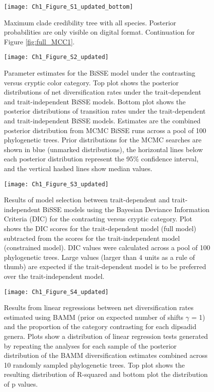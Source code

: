 \begin{figure}[h]
	\centering
	\texttt{[image: Ch1\_Figure\_S1\_updated\_bottom]}
	\caption[Maximum clade credibility tree with all species (Part 2).]{Maximum clade credibility tree with all species. Posterior probabilities are only visible on digital format. Continuation for Figure \ref{fig:full_MCC1}.}
	\label{fig:full_MCC2} %
\end{figure}

\begin{figure}[h]
	\centering
	\texttt{[image: Ch1\_Figure\_S2\_updated]}
	\caption[Parameter estimates for the BiSSE model under the contrasting versus cryptic color category.]{Parameter estimates for the BiSSE model under the contrasting versus cryptic color category. Top plot shows the posterior distributions of net diversification rates under the trait-dependent and trait-independent BiSSE models. Bottom plot shows the posterior distributions of transition rates under the trait-dependent and trait-independent BiSSE models. Estimates are the combined posterior distribution from MCMC BiSSE runs across a pool of 100 phylogenetic trees. Prior distributions for the MCMC searches are shown in blue (unmarked distributions), the horizontal lines below each posterior distribution represent the 95\% confidence interval, and the vertical hashed lines show median values.}
	\label{fig:par_BiSSE} %
\end{figure}

\begin{figure}[h]
	\centering
	\texttt{[image: Ch1\_Figure\_S3\_updated]}
	\caption[Results of model selection between trait-dependent and trait-independent BiSSE models.]{Results of model selection between trait-dependent and trait-independent BiSSE models using the Bayesian Deviance Information Criteria (DIC) for the contrasting versus cryptic category. Plot shows the DIC scores for the trait-dependent model (full model) subtracted from the scores for the trait-independent model (constrained model). DIC values were calculated across a pool of 100 phylogenetic trees. Large values (larger than 4 units as a rule of thumb) are expected if the trait-dependent model is to be preferred over the trait-independent model.}
	\label{fig:model_select} %
\end{figure}

\begin{figure}[h]
	\centering
	\texttt{[image: Ch1\_Figure\_S4\_updated]}
	\caption[Results from linear regressions between net diversification rates estimated using BAMM.]{Results from linear regressions between net diversification rates estimated using BAMM (prior on expected number of shifts $\gamma$ = 1) and the proportion of the category contrasting for each dipsadid genera. Plots show a distribution of linear regression tests generated by repeating the analyses for each sample of the posterior distribution of the BAMM diversification estimates combined across 10 randomly sampled phylogenetic trees. Top plot shows the resulting distribution of R-squared and bottom plot the distribution of p values.}
	\label{fig:supp_linear_BAMM} %
\end{figure}


